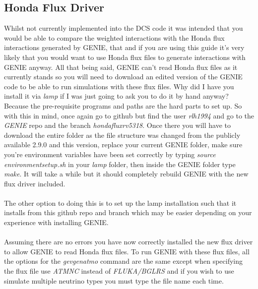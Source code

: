 \documentclass[12pt]{article}
\numberwithin{equation}{section}
\numberwithin{figure}{section}
\begin{document}
\subsection{Honda Flux Driver} %
\label{sub:honda_flux_driver}
Whilst not currently implemented into the DCS code it was intended that you would be able to compare the weighted interactions with the Honda flux interactions generated by GENIE, that and if you are using this guide it's very likely that you would want to use Honda flux files to generate interactions with GENIE anyway. All that being said, GENIE can't read Honda flux files as it currently stands so you will need to download an edited version of the GENIE code to be able to run simulations with these flux files. Why did I have you install it via \emph{lamp} if I was just going to ask you to do it by hand anyway? Because the pre-requisite programs and paths are the hard parts to set up. So with this in mind, once again go to github but find the user \emph{rlh1994} and go to the \emph{GENIE} repo and the branch \emph{honda\textunderscore flux\textunderscore rv5318}. Once there you will have to download the entire folder as the file structure was changed from the publicly available 2.9.0 and this version, replace your current GENIE folder, make sure you're environment variables have been set correctly by typing \emph{source environment\textunderscore setup.sh} in your \emph{lamp} folder, then inside the GENIE folder type \emph{make}. It will take a while but it should completely rebuild GENIE with the new flux driver included.\\
\\
The other option to doing this is to set up the lamp installation such that it installs from this github repo and branch which may be easier depending on your experience with installing GENIE.\\
\\
Assuming there are no errors you have now correctly installed the new flux driver to allow GENIE to read Honda flux files. To run GENIE with these flux files, all the options for the \emph{gevgen\textunderscore atmo} command are the same except when specifying the flux file use \emph{ATMNC} instead of \emph{FLUKA/BGLRS} and if you wish to use simulate multiple neutrino types you must type the file name each time.
%
%
\end{document}
